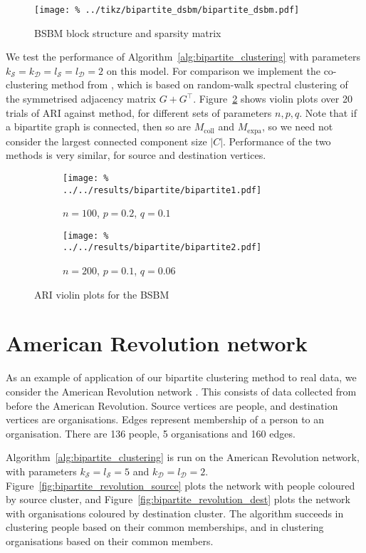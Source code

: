\documentclass[12pt]{ociamthesis}
\theoremstyle{plain}
\theoremstyle{definition}
\theoremstyle{remark}
\newcommand\ca[1]{\mathcal{#1}}
\begin{document}
\begin{figure}[H]
\centering
\texttt{[image: \%
../tikz/bipartite\_dsbm/bipartite\_dsbm.pdf]}
\caption{BSBM block structure and sparsity matrix}
\label{fig:bipartite_bsbm}
\end{figure}

We test the performance of Algorithm~\ref{alg:bipartite_clustering} with
parameters $k_\ca{S} = k_\ca{D} = l_\ca{S} = l_\ca{D} = 2$ on this model.
For comparison we implement the co-clustering method from \cite{dhillon2001co},
which is based on random-walk spectral clustering of the symmetrised adjacency
matrix $G+G^\top$.
Figure~\ref{fig:bipartite} shows violin plots over 20 trials of ARI against
method, for different sets of parameters $n,p,q$.
Note that if a bipartite graph is connected, then so are $M_\mathrm{coll}$ and
$M_\mathrm{expa}$, so we need not consider the largest connected component size
$|C|$.
Performance of the two methods is very similar, for source and destination
vertices.

\begin{figure}[H]
\begin{subfigure}{.49\textwidth}
\centering
\texttt{[image: \%
../../results/bipartite/bipartite1.pdf]}
\caption{$n=100$, $p=0.2$, $q=0.1$}
\end{subfigure}
\begin{subfigure}{.49\textwidth}
\centering
\texttt{[image: \%
../../results/bipartite/bipartite2.pdf]}
\caption{$n=200$, $p=0.1$, $q=0.06$}
\end{subfigure}
\caption{ARI violin plots for the BSBM}
\label{fig:bipartite}
\end{figure}

\section{American Revolution network} \label{sec:bipartite_american_revolution}

As an example of application of our bipartite clustering method to real data,
we consider the American Revolution network \cite{konect:brunson_revolution}.
This consists of data collected from before the American Revolution. Source
vertices are people, and destination vertices are organisations. Edges
represent membership of a person to an organisation. There are 136 people, 5
organisations and 160 edges.

Algorithm~\ref{alg:bipartite_clustering} is run on the American Revolution
network, with parameters $k_\ca{S} = l_\ca{S} = 5$ and $k_\ca{D} = l_\ca{D} =
2$. Figure~\ref{fig:bipartite_revolution_source} plots the network with people
coloured by source cluster, and Figure~\ref{fig:bipartite_revolution_dest}
plots the network with organisations coloured by destination cluster. The
algorithm succeeds in clustering people based on their common memberships, and
in clustering organisations based on their common members.
\end{document}
